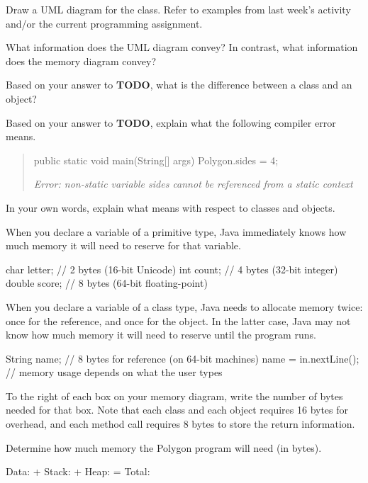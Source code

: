 \documentclass[12pt]{article}
\begin{document}
\Q Draw a UML diagram for the  class.
Refer to examples from last week's activity and/or the current programming assignment.

\Q What information does the UML diagram convey?
In contrast, what information does the memory diagram convey?

\Q Based on your answer to \textbf{TODO}, what is the difference between a class and an object?

\Q Based on your answer to \textbf{TODO}, explain what the following compiler error means.

\begin{quote}
\begin{javalst}
public static void main(String[] args) {
    Polygon.sides = 4;
}
\end{javalst}

\it Error: non-static variable sides cannot be referenced from a static context
\end{quote}

\Q In your own words, explain what  means with respect to classes and objects.



When you declare a variable of a primitive type, Java immediately knows how much memory it will need to reserve for that variable.

\begin{javalst}
char letter;   // 2 bytes (16-bit Unicode)
int count;     // 4 bytes (32-bit integer)
double score;  // 8 bytes (64-bit floating-point)
\end{javalst}

When you declare a variable of a class type, Java needs to allocate memory twice: once for the reference, and once for the object. In the latter case, Java may not know how much memory it will need to reserve until the program runs.

\begin{javalst}
String name;           // 8 bytes for reference (on 64-bit machines)
name = in.nextLine();  // memory usage depends on what the user types
\end{javalst}


\Q To the right of each box on your memory diagram, write the number of bytes needed for that box. Note that each class and each object requires 16 bytes for overhead, and each method call requires 8 bytes to store the return information.

\Q Determine how much memory the Polygon program will need (in bytes).

\begin{center}
Data: \blank  +  Stack: \blank  +  Heap: \blank  =  Total: \blank
\end{center}
\end{document}
